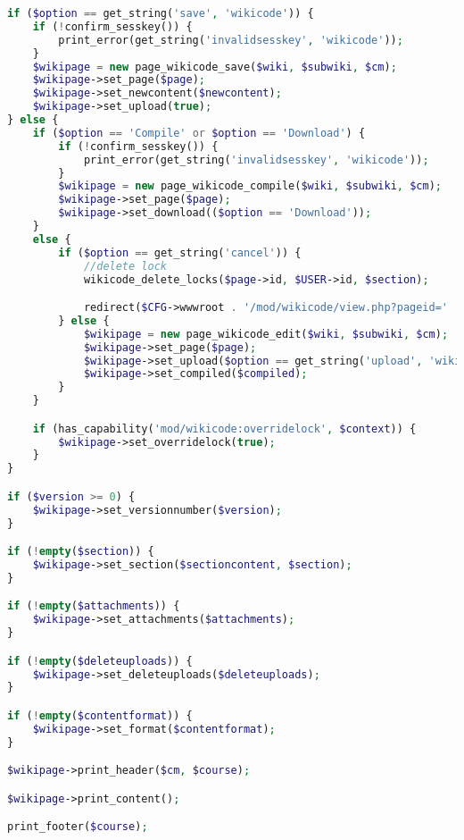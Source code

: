 \begin{lstlisting}[language=PHP]
if ($option == get_string('save', 'wikicode')) {
    if (!confirm_sesskey()) {
        print_error(get_string('invalidsesskey', 'wikicode'));
    }
    $wikipage = new page_wikicode_save($wiki, $subwiki, $cm);
    $wikipage->set_page($page);
    $wikipage->set_newcontent($newcontent);
    $wikipage->set_upload(true);
} else {  
    if ($option == 'Compile' or $option == 'Download') {
        if (!confirm_sesskey()) {
            print_error(get_string('invalidsesskey', 'wikicode'));
        }
        $wikipage = new page_wikicode_compile($wiki, $subwiki, $cm);
        $wikipage->set_page($page);
		$wikipage->set_download(($option == 'Download'));
    }
	else {
        if ($option == get_string('cancel')) {
            //delete lock
            wikicode_delete_locks($page->id, $USER->id, $section);

            redirect($CFG->wwwroot . '/mod/wikicode/view.php?pageid=' . $pageid);
        } else {
            $wikipage = new page_wikicode_edit($wiki, $subwiki, $cm);
            $wikipage->set_page($page);
            $wikipage->set_upload($option == get_string('upload', 'wikicode'));
			$wikipage->set_compiled($compiled);
        }
    }

    if (has_capability('mod/wikicode:overridelock', $context)) {
        $wikipage->set_overridelock(true);
    }
}

if ($version >= 0) {
    $wikipage->set_versionnumber($version);
}

if (!empty($section)) {
    $wikipage->set_section($sectioncontent, $section);
}

if (!empty($attachments)) {
    $wikipage->set_attachments($attachments);
}

if (!empty($deleteuploads)) {
    $wikipage->set_deleteuploads($deleteuploads);
}

if (!empty($contentformat)) {
    $wikipage->set_format($contentformat);
}

$wikipage->print_header($cm, $course);

$wikipage->print_content();

print_footer($course);
\end{lstlisting}

